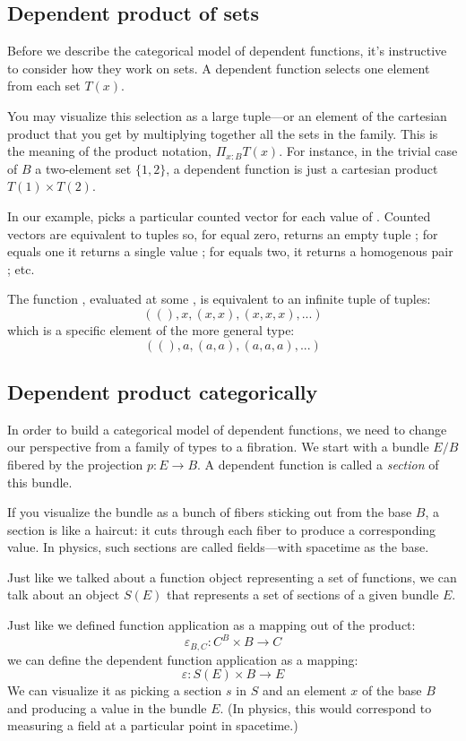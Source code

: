 \documentclass[DaoFP]{subfiles}
\begin{document}
\subsection{Dependent product of sets}
Before we describe the categorical model of dependent functions, it's instructive to consider how they work on sets. A dependent function selects one element from each set $T(x)$. 

You may visualize this selection as a large tuple---or an element of the cartesian product that you get by multiplying together all the sets in the family. This is the meaning of the product notation, $\Pi_{x:B} T(x)$. For instance, in the trivial case of $B$ a two-element set $\{1, 2\}$, a dependent function is just a cartesian product $T(1) \times T(2)$. 

In our example,  picks a particular counted vector for each value of . Counted vectors are equivalent to tuples so, for  equal zero,  returns an empty tuple \hask{()}; for  equals one it returns a single value ; for  equals two, it returns a homogenous pair ; etc. 

The function , evaluated at some ,  is equivalent to an infinite tuple of tuples:
\[ ((), x, (x, x), (x, x, x), ...) \]
which is a specific element of the more general type:
\[ ((), a, (a, a), (a, a, a), ...) \]

\subsection{Dependent product categorically}
In order to build a categorical model of dependent functions, we need to change our perspective from a family of types to a fibration. We start with a bundle $E/B$ fibered by the projection $p\colon E \to B$. A dependent function is called a \emph{section} of this bundle. 

If you visualize the bundle as a bunch of fibers sticking out from the base $B$, a section is like a haircut: it cuts through each fiber to produce a corresponding value. In physics, such sections are called fields---with spacetime as the base. 

Just like we talked about a function object representing a set of functions, we can talk about an object $S(E)$ that represents a set of sections of a given bundle $E$. 

Just like we defined function application as a mapping out of the product:
\[\varepsilon_{B, C} \colon C^B \times B \to C\]
we can define the dependent function application as a mapping:
\[\varepsilon \colon S(E) \times B \to E\]
We can visualize it as picking a section $s$ in $S$ and an element $x$ of the base $B$ and producing a value in the bundle $E$. (In physics, this would correspond to measuring a field at a particular point in spacetime.)
\end{document}
